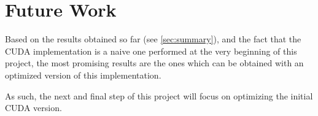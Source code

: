\section{Future Work}
\label{sec:future}

Based on the results obtained so far (see \cref{sec:summary}), and the fact that the CUDA implementation is a naive one performed at the very beginning of this project, the most promising results are the ones which can be obtained with an optimized version of this implementation.

As such, the next and final step of this project will focus on optimizing the initial CUDA version. 